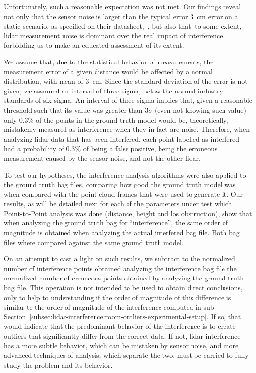 Unfortunately, such a reasonable expectation was not met. Our findings reveal not only that the sensor noise is larger than the typical error \SI{3}{\centi\meter} error on a static scenario, as specified on their datasheet,~\cite{VLP16}, but also that, to some extent, \ac{lidar} measurement noise is dominant over the real impact of interference, forbidding us to make an educated assessment of its extent.

We assume that, due to the statistical behavior of measurements, the measurement error of a given distance would be affected by a normal distribution, with mean of \SI{3}{\centi\meter}. Since the standard deviation of the error is not given, we assumed an interval of three sigma, below the normal industry standards of six sigma. An interval of three sigma implies that, given a reasonable threshold such that its value was greater than $3\sigma$ (even not knowing such value) only 0.3\% of the points in the ground truth model would be, theoretically, mistakenly measured as interference when they in fact are noise. Therefore, when analyzing \ac{lidar} data that has been interfered, each point labelled as interfered had a probability of $0.3\%$ of being a false positive, being the erroneous measurement caused by the sensor noise, and not the other \ac{lidar}.

To test our hypotheses, the interference analysis algorithms were also applied to the ground truth bag files, comparing how good the ground truth model was when compared with the point cloud frames that were used to generate it. Our results, as will be detailed next for each of the parameters under test which Point-to-Point analysis was done (distance, height and \ac{los} obstruction), show that when analyzing the ground truth bag for ``interference'', the same order of magnitude is obtained when analyzing the actual interfered bag file. Both bag files where compared against the same ground truth model.

On an attempt to cast a light on such results, we subtract to the normalized number of interference points obtained analyzing the interference bag file the normalized number of erroneous points obtained by analyzing the ground truth bag file. This operation is not intended to be used to obtain direct conclusions, only to help to understanding if the order of magnitude of this difference is similar to the order of magnitude of the interference computed in sub-Section~\ref{subsec:lidar-interference:room-outliers-experimental-setup}. If so, that would indicate that the predominant behavior of the interference is to create outliers that significantly differ from the correct data. If not, \ac{lidar} interference has a more subtle behavior, which can be mistaken by sensor noise, and more advanced techniques of analysis, which separate the two, must be carried to fully study the problem and its behavior.

